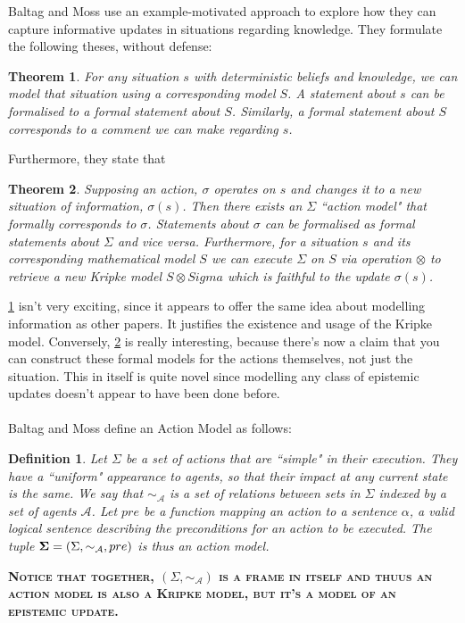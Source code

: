 \documentclass[10pt, a4paper, twoside]{article}
\newcommand{\aRel}[1] {
  \sim_{\mathcal{#1} }
}
\newcommand{\kripkeFrame}[2] {
  (#1, \aRel{#2})
}
\newcommand{\actModel}[3]{
  (#1, \aRel{#2}, #3)
}
\newcommand{\note}[1]{\textsc{\textbf{#1}}}
\newtheorem{defn}{Definition}
\newtheorem{thm}{Theorem}
\begin{document}
Baltag and Moss use an example-motivated approach to explore how they can
capture informative updates in situations regarding knowledge.
They formulate the following theses, without defense:
\begin{thm}\label{situationModel}
For any situation $s$ with deterministic beliefs and knowledge, we can model
that situation using a corresponding model $S$.
A statement about $s$ can be formalised to a formal statement about $S$.
Similarly, a formal statement about $S$ corresponds to a comment we can make
regarding $s$.
\end{thm}
Furthermore, they state that
\begin{thm}\label{actionModelExists}
Supposing an action, $\sigma$ operates on $s$ and changes it to a new situation
of information, $\sigma(s)$.
Then there exists an $\Sigma$ ``action model" that formally corresponds to
$\sigma$.
Statements about $\sigma$ can be formalised as formal statements about $\Sigma$
and vice versa.
Furthermore, for a situation $s$ and its corresponding mathematical model $S$ we
can execute $\Sigma$ on $S$ via operation $\otimes$ to retrieve a new Kripke
model $S \otimes Sigma$ which is faithful to the update $\sigma(s)$.
\end{thm}
\ref{situationModel} isn't very exciting, since it appears to offer the same
idea about modelling information as other papers.
It justifies the existence and usage of the Kripke model.
Conversely, \ref{actionModelExists} is really interesting, because there's now
a claim that you can construct these formal models for the actions themselves,
not just the situation.
This in itself is quite novel since modelling any class of epistemic updates
doesn't appear to have been done before.\\
\\
Baltag and Moss define an Action Model as follows:
\begin{defn}
Let $\Sigma$ be a set of actions that are ``simple" in their execution.
They have a ``uniform" appearance to agents, so that their impact at any current
state is the same.
We say that $\aRel{A}$ is a set of relations between sets in $\Sigma$ indexed
by a set of agents $\mathcal{A}$.
Let $pre$ be a function mapping an action to a sentence $\alpha$, a valid
logical sentence describing the preconditions for an action to be executed.
The tuple ${\bf \Sigma} = \actModel{\Sigma}{A}{pre}$ is thus an action model.
\end{defn}
\note{Notice that together, $\kripkeFrame{\Sigma}{A}$ is a frame in
itself and thuus an action model is also a Kripke model, but it's a model of
an epistemic update.}
\end{document}

